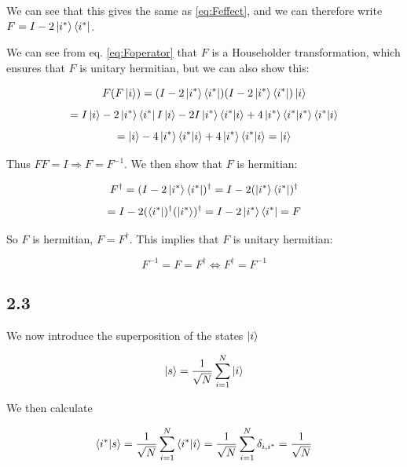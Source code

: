 \documentclass[a4paper,norsk, 10pt]{article}
\begin{document}
We can see that this gives the same as \eqref{eq:Feffect}, and we can therefore write $F = I - 2\ket{i^*}\bra{i^*}$.

We can see from eq. \ref{eq:Foperator} that $F$ is a Householder transformation, which ensures that $F$ is unitary hermitian, but we can also show this:

\begin{equation}
F(F\ket{i}) = (I - 2\ket{i^*}\bra{i^*})(I - 2\ket{i^*}\bra{i^*})\ket{i}
\end{equation}
\begin{equation}
= I\ket{i} - 2\ket{i^*}\bra{i^*}I\ket{i} -2I\ket{i^*}\bra{i^*}\ket{i} + 4\ket{i^*}\bra{i^*}\ket{i^*}\bra{i^*}\ket{i}
\end{equation}
\begin{equation}
= \ket{i} - 4\ket{i^*}\bra{i^*}\ket{i} + 4\ket{i^*}\bra{i^*}\ket{i} = \ket{i}
\end{equation}

Thus $FF = I \Rightarrow F = F^{-1}$. We then show that $F$ is hermitian:

\begin{equation}
F^\dagger = (I - 2\ket{i^*}\bra{i^*})^\dagger = I - 2(\ket{i^*}\bra{i^*})^\dagger
\end{equation}
\begin{equation}
= I - 2(\bra{i^*})^\dagger(\ket{i^*})^\dagger = I - 2\ket{i^*}\bra{i^*} = F
\end{equation}

So $F$ is hermitian, $F = F^\dagger$. This implies that $F$ is unitary hermitian:

\begin{equation}
F^{-1} = F = F^\dagger \Leftrightarrow F^\dagger = F^{-1}
\end{equation}


\subsection{2.3}
We now introduce the superposition of the states $\ket{i}$

\begin{equation}
\ket{s} = \frac{1}{\sqrt{N}} \sum_{i=1}^N \ket{i}
\end{equation}

We then calculate 

\begin{equation}
\braket{i^*}{s} = \frac{1}{\sqrt{N}} \sum_{i=1}^N \braket{i^*}{i} = \frac{1}{\sqrt{N}} \sum_{i=1}^N \delta_{i,i^*} = \frac{1}{\sqrt{N}} 
\end{equation}\label{eq:is}
\end{document}
